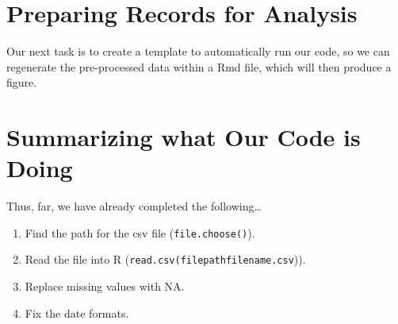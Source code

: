 \documentclass{article}\usepackage[]{graphicx}\usepackage[]{color}
\begin{document}








\section{Preparing Records for Analysis}

Our next task is to create a template to automatically run our code, so we can regenerate the pre-processed data within a Rmd file, which will then produce a figure. 

\section{Summarizing what Our Code is Doing}




Thus, far, we have already completed the following\ldots

\begin{enumerate}
  \item Find the path for the csv file (\texttt{file.choose()}).
  \item Read the file into R (\texttt{read.csv(filepathfilename.csv})).
  \item Replace missing values with NA.
  \item Fix the date formats.
\end{enumerate}
\end{document}
